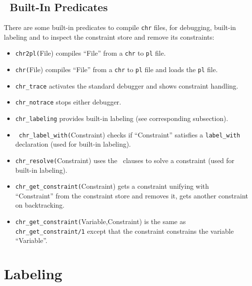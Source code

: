 \subsection{\chr\ Built-In Predicates}

There are some built-in predicates to compile {\tt chr} files, for
debugging, built-in labeling and to
inspect the constraint store and remove its constraints:
\begin{itemize}

\item {\tt chr2pl(}File) compiles ``File'' from a {\tt chr} to {\tt pl} file.  

\item {\tt chr(}File) compiles ``File'' from a {\tt chr} to
{\tt pl} file and loads the {\tt pl} file.  

\item \verb/chr_trace/ activates the standard debugger and
shows constraint handling.
\item \verb/chr_notrace/ stops either debugger.

\item {\tt chr\_labeling}
provides built-in labeling (see corresponding subsection).  
\item {\tt
chr\_label\_with(}Constraint) checks if ``Constraint'' satisfies a
{\tt label\_with} declaration (used for built-in labeling).  
\item {\tt chr\_resolve(}Constraint) uses the \eclipse\ 
clauses to solve a constraint (used for built-in labeling).

\item {\tt chr\_get\_constraint(}Constraint)
gets a constraint unifying with ``Constraint'' from the constraint
store and removes it, gets another constraint on backtracking.
\item {\tt chr\_get\_constraint(}Variable,Constraint) is the same as 
{\tt chr\_get\_constraint/1} except that the constraint constrains the variable
``Variable''.

\end{itemize}




\section{Labeling}

